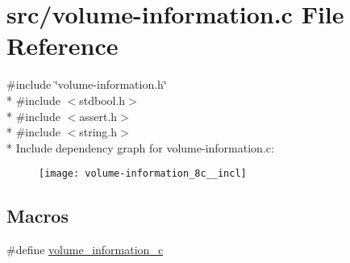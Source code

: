 \hypertarget{volume-information_8c}{\section{src/volume-\/information.c File Reference}
\label{volume-information_8c}
}
{\ttfamily \#include \char`\"{}volume-\/information.\-h\char`\"{}}\\*
{\ttfamily \#include $<$stdbool.\-h$>$}\\*
{\ttfamily \#include $<$assert.\-h$>$}\\*
{\ttfamily \#include $<$string.\-h$>$}\\*
Include dependency graph for volume-\/information.c\-:\nopagebreak
\begin{figure}[H]
\begin{center}
\leavevmode
\texttt{[image: volume-information\_8c\_\_incl]}
\end{center}
\end{figure}
\subsection*{Macros}
\begin{DoxyCompactItemize}
\item 
\#define \hyperlink{volume-information_8c_aa2ebcd0c3a3beac7a43ef1b7be6be0b3}{volume\-\_\-information\-\_\-c}
\end{DoxyCompactItemize}
